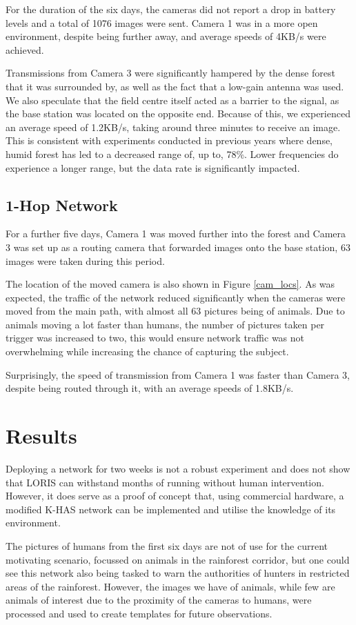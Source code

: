 	For the duration of the six days, the cameras did not report a drop in battery levels and a total of 1076 images were sent. Camera 1 was in a more open environment, despite being further away, and average speeds of 4KB/s were achieved. 
	
	Transmissions from Camera 3 were significantly hampered by the dense forest that it was surrounded by, as well as the fact that a low-gain antenna was used. We also speculate that the field centre itself acted as a barrier to the signal, as the base station was located on the opposite end. Because of this, we experienced an average speed of 1.2KB/s, taking around three minutes to receive an image. This is consistent with experiments conducted in previous years where dense, humid forest has led to a decreased range of, up to, 78\%. Lower frequencies do experience a longer range, but the data rate is significantly impacted.
	
	\subsection{1-Hop Network}
	For a further five days, Camera 1 was moved further into the forest and Camera 3 was set up as a routing camera that forwarded images onto the base station, 63 images were taken during this period.
	
	The location of the moved camera is also shown in Figure \ref{cam_locs}. As was expected, the traffic of the network reduced significantly when the cameras were moved from the main path, with almost all 63 pictures being of animals. Due to animals moving a lot faster than humans, the number of pictures taken per trigger was increased to two, this would ensure network traffic was not overwhelming while increasing the chance of capturing the subject.
	
	Surprisingly, the speed of transmission from Camera 1 was faster than Camera 3, despite being routed through it, with an average speeds of 1.8KB/s.				
	\section{Results}\label{loris:res}
	Deploying a network for two weeks is not a robust experiment and does not show that LORIS can withstand months of running without human intervention. However, it does serve as a proof of concept that, using commercial hardware, a modified K-HAS network can be implemented and utilise the knowledge of its environment.
	
	The pictures of humans from the first six days are not of use for the current motivating scenario, focussed on animals in the rainforest corridor, but one could see this network also being tasked to warn the authorities of hunters in restricted areas of the rainforest. However, the images we have of animals, while few are animals of interest due to the proximity of the cameras to humans, were processed and used to create templates for future observations. 
	
